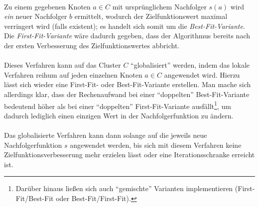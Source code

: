 \phantom \\
\noindent Zu einem gegebenen Knoten $a \in C$ mit ursprünglichem Nachfolger $s(a)$ wird \textit{ein} neuer Nachfolger $b$ ermittelt, wodurch der Zielfunktionswert maximal verringert wird (falls existent); es handelt sich somit um die \textit{Best-Fit-Variante}. Die \textit{First-Fit-Variante} wäre dadurch gegeben, dass der Algorithmus bereits nach der ersten Verbesserung des Zielfunktionswertes abbricht.\\
\\
Dieses Verfahren kann auf das Cluster $C$ "`globalisiert"' werden, indem das lokale Verfahren reihum auf jeden einzelnen Knoten $a \in C$ angewendet wird. Hierzu lässt sich wieder eine First-Fit- oder Best-Fit-Variante erstellen. Man mache sich allerdings klar, dass der Rechenaufwand bei einer "`doppelten"' Best-Fit-Variante bedeutend höher als bei einer "`doppelten"' First-Fit-Variante ausfällt\footnote{Darüber hinaus ließen sich auch "`gemischte"' Varianten implementieren (First-Fit/Best-Fit oder Best-Fit/First-Fit).}, um dadurch lediglich einen einzigen Wert in der Nachfolgerfunktion zu ändern.\\
\\
Das globalisierte Verfahren kann dann solange auf die jeweils neue Nachfolgerfunktion $s$ angewendet werden, bis sich mit diesem Verfahren keine Zielfunktionsverbesserung mehr erzielen lässt  oder eine Iterationsschranke erreicht ist.

